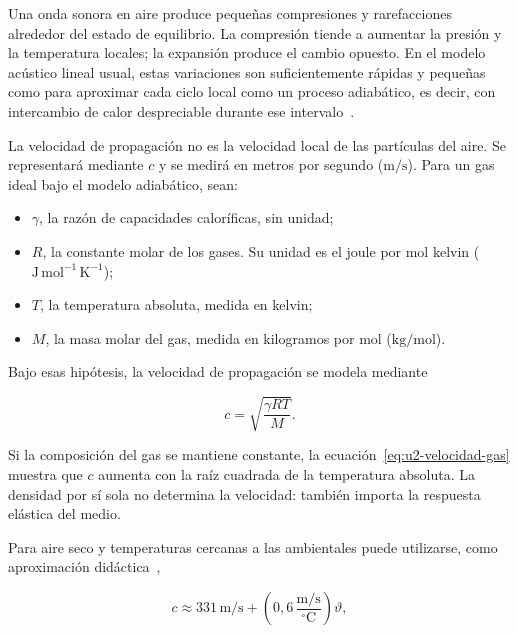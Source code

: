 Una onda sonora en aire produce pequeñas compresiones y rarefacciones alrededor del estado de equilibrio. La compresión tiende a aumentar la presión y la temperatura locales; la expansión produce el cambio opuesto. En el modelo acústico lineal usual, estas variaciones son suficientemente rápidas y pequeñas como para aproximar cada ciclo local como un proceso adiabático, es decir, con intercambio de calor despreciable durante ese intervalo~\cite{xiangBlauert2021}.

La velocidad de propagación no es la velocidad local de las partículas del aire. Se representará mediante \(c\) y se medirá en metros por segundo (\(\text{m}/\text{s}\)). Para un gas ideal bajo el modelo adiabático, sean:

\begin{itemize}
    \item \(\gamma\), la razón de capacidades caloríficas, sin unidad;
    \item \(R\), la constante molar de los gases. Su unidad es el joule por mol kelvin (\(\text{J}\,\text{mol}^{-1}\,\text{K}^{-1}\));
    \item \(T\), la temperatura absoluta, medida en kelvin;
    \item \(M\), la masa molar del gas, medida en kilogramos por mol (\(\text{kg}/\text{mol}\)).
\end{itemize}

Bajo esas hipótesis, la velocidad de propagación se modela mediante~\cite{cramer1993,xiangBlauert2021}

\begin{equation}
    c=\sqrt{\frac{\gamma RT}{M}}.
    \label{eq:u2-velocidad-gas}
\end{equation}

Si la composición del gas se mantiene constante, la ecuación~\eqref{eq:u2-velocidad-gas} muestra que \(c\) aumenta con la raíz cuadrada de la temperatura absoluta. La densidad por sí sola no determina la velocidad: también importa la respuesta elástica del medio.

Para aire seco y temperaturas cercanas a las ambientales puede utilizarse, como aproximación didáctica~\cite{cramer1993,xiangBlauert2021},

\begin{equation}
    c\approx
    331\,\text{m}/\text{s}
    +\left(0{,}6\,\frac{\text{m}/\text{s}}{^{\circ}\text{C}}\right)\vartheta,
    \label{eq:u2-velocidad-temperatura}
\end{equation}

